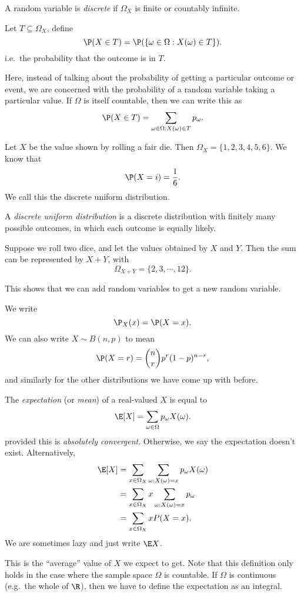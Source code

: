 \documentclass[a4paper]{article}
\begin{document}
\begin{defi}
  A random variable is \emph{discrete} if $\Omega_X$ is finite or countably infinite.
\end{defi}

\begin{notation}
  Let $T\subseteq \Omega_X$, define
  \[
    \P(X\in T) = \P(\{\omega \in \Omega: X(\omega) \in T\}).
  \]
  i.e.\ the probability that the outcome is in $T$.
\end{notation}
Here, instead of talking about the probability of getting a particular outcome or event, we are concerned with the probability of a random variable taking a particular value. If $\Omega$ is itself countable, then we can write this as
\[
  \P(X \in T) = \sum_{\omega \in \Omega: X(\omega)\in T}p_\omega.
\]
\begin{eg}
  Let $X$ be the value shown by rolling a fair die. Then $\Omega_X = \{1, 2, 3, 4, 5, 6\}$. We know that
  \[
    \P(X = i) = \frac{1}{6}.
  \]
  We call this the discrete uniform distribution.
\end{eg}
\begin{defi}
  A \emph{discrete uniform distribution} is a discrete distribution with finitely many possible outcomes, in which each outcome is equally likely.
\end{defi}

\begin{eg}
  Suppose we roll two dice, and let the values obtained by $X$ and $Y$. Then the sum can be represented by $X + Y$, with
  \[
    \Omega_{X + Y} = \{2, 3, \cdots, 12\}.
  \]
\end{eg}
This shows that we can add random variables to get a new random variable.

\begin{notation}
  We write
  \[
    \P_X(x) = \P(X = x).
  \]
  We can also write $X\sim B(n, p)$ to mean
  \[
    \P(X = r) = \binom{n}{r}p^r(1 - p)^{n - r},
  \]
  and similarly for the other distributions we have come up with before.
\end{notation}

\begin{defi}[Expectation]
  The \emph{expectation} (or \emph{mean}) of a real-valued $X$ is equal to
  \[
    \E[X] = \sum_{\omega\in \Omega}p_\omega X(\omega).
  \]
  provided this is \emph{absolutely convergent}. Otherwise, we say the expectation doesn't exist. Alternatively,
  \begin{align*}
    \E[X] &= \sum_{x\in \Omega_X}\sum_{\omega: X(\omega) = x}p_\omega X(\omega)\\
    &= \sum_{x\in \Omega_X}x\sum_{\omega:X(\omega) = x}p_\omega\\
    &= \sum_{x\in \Omega_X}xP(X = x).
  \end{align*}
  We are sometimes lazy and just write $\E X$.
\end{defi}
This is the ``average'' value of $X$ we expect to get. Note that this definition only holds in the case where the sample space $\Omega$ is countable. If $\Omega$ is continuous (e.g.\ the whole of $\R$), then we have to define the expectation as an integral.
\end{document}
